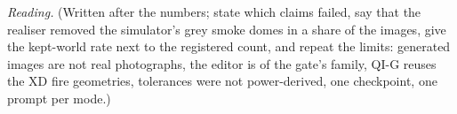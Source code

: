 \emph{Reading.} (Written after the numbers; state which claims failed, say that the realiser removed the simulator's grey smoke domes in a share of the images, give the kept-world rate next to the registered count, and repeat the limits: generated images are not real photographs, the editor is of the gate's family, QI-G reuses the XD fire geometries, tolerances were not power-derived, one checkpoint, one prompt per mode.)
